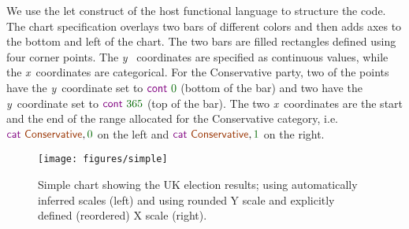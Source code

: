 \documentclass{jfp}
\newcommand{\X}{\emph{x}\ }
\newcommand{\Y}{\emph{y}\ }
\newcommand{\num}[1]{\textcolor{numclr}{#1}}
\newcommand{\strf}[1]{\textnormal{\textcolor{strclr}{\sffamily #1}}}
\newcommand{\kvd}[1]{\textnormal{\textcolor{kvdclr}{\sffamily #1}}}
\newcommand{\fkvd}[1]{\textnormal{\textcolor{fkvdclr}{\sffamily #1}}}
\begin{document}
\vspace{-0.25em}
\noindent
We use the \fkvd{let} construct of the host functional language to structure the code. The chart
specification overlays two bars of different colors and then adds axes to the bottom and left of the chart.
The two bars are filled rectangles defined using four corner points. The \Y
coordinates are specified as continuous values, while the \X coordinates are categorical. For
the Conservative party, two of the points have the \Y coordinate set to $\kvd{cont}~\num{0}$ (bottom of the bar)
and two have the \Y coordinate set to $\kvd{cont}~\num{365}$ (top of the bar). The two \X coordinates
are the start and the end of the range allocated for the \strf{Conservative} category,
i.e.~$\kvd{cat}~\strf{Conservative}, \num{0}$ on the left and $\kvd{cat}~\strf{Conservative}, \num{1}$
on the right.

\begin{figure}
  \texttt{[image: figures/simple]}
  \vspace{0.25em}
  \caption{Simple chart showing the UK election results; using automatically inferred scales (left)
    and using rounded Y scale and explicitly defined (reordered) X scale (right).}
  \label{fig:simple}
  \vspace{-1.5em}
\end{figure}
\end{document}
